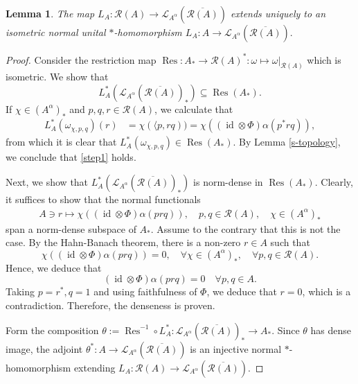 \documentclass[reqno]{amsart}
\numberwithin{equation}{section}
\newtheorem{Lem}[Theorem]{Lemma}
\DeclareMathOperator{\id}{\mathrm{id}}
\begin{document}
\begin{Lem}
    The map
    $L_A: \mathcal{R}(A)\to \mathscr{L}_{A^\alpha}(\overline{\mathcal{R}(A)})$
    extends uniquely to an isometric normal unital $*$-homomorphism
    $L_A: A\to \mathscr{L}_{A^\alpha}(\overline{\mathcal{R}(A)}).$
\end{Lem}
\begin{proof}
     Consider the restriction map
    $\operatorname{Res}: A_*\to \mathcal{R}(A)^*: \omega \mapsto \omega\vert_{\mathcal{R}(A)}$
    which is isometric. We show that 
    \begin{equation}\label{step1}
        L_A^*(\mathscr{L}_{A^\alpha}(\overline{\mathcal{R}(A)})_*)\subseteq \operatorname{Res}(A_*).
    \end{equation} If $\chi\in (A^\alpha)_*$ and $p,q,r\in \mathcal{R}(A)$, we calculate that 
    \begin{align*}
        L_A^*(\omega_{\chi, p,q})(r)&= \chi(\langle p, rq))= \chi((\id \otimes \Phi)\alpha(p^* rq)),
    \end{align*} 
    from which it is clear that $L_A^*(\omega_{\chi, p,q})\in \operatorname{Res}(A_*)$. By Lemma \ref{s-topology}, we conclude that \eqref{step1} holds.
    
  Next, we show that $L_A^*(\mathscr{L}_{A^\alpha}(\overline{\mathcal{R}(A)})_*)$ is norm-dense in $\operatorname{Res}(A_*).$ Clearly, it suffices to show that the normal functionals
    \begin{align*}\label{normals}
        A \ni r \mapsto \chi((\id \otimes \Phi)\alpha(prq)), \quad p,q \in \mathcal{R}(A), \quad \chi\in (A^\alpha)_*
    \end{align*}
    span a norm-dense subspace of $A_*$. Assume to the contrary that this is not the case. By the Hahn-Banach theorem, there is a non-zero $r \in A$ such that
    $$\chi((\id \otimes \Phi)\alpha(prq)) = 0, \quad \forall \chi \in (A^\alpha)_*, \quad \forall p,q\in \mathcal{R}(A).$$
Hence, we deduce that 
$$(\id \otimes \Phi)\alpha(prq) = 0 \quad \forall p,q \in A.$$
Taking $p = r^*, q = 1$ and using faithfulness of $\Phi$, we deduce that $r= 0$, which is a contradiction. Therefore, the denseness is proven.

Form the composition
    $\theta:= \operatorname{Res}^{-1}\circ L_A^*: \mathscr{L}_{A^\alpha}(\overline{\mathcal{R}(A)})_*\to A_*.$
   Since $\theta$ has dense image, the adjoint $\theta^*: A\to \mathscr{L}_{A^\alpha}(\overline{\mathcal{R}(A)})$ is an injective normal $*$-homomorphism extending $L_A: \mathcal{R}(A)\to \mathscr{L}_{A^\alpha}(\overline{\mathcal{R}(A)}).$
\end{proof}
\end{document}
